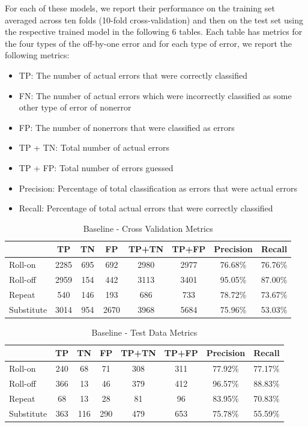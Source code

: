 \documentclass[letterpaper, 10 pt, conference]{ieeeconf}  %
\begin{document}
For each of these models, we report their performance on the training set averaged across ten folds (10-fold cross-validation) and then on the test set using the respective trained model in the following 6 tables. Each table has metrics for the four types of the off-by-one error and for each type of error, we report the following metrics:
\begin{itemize}
\item TP: The number of actual errors that were correctly classified
\item FN: The number of actual errors which were incorrectly classified as some other type of error of nonerror
\item FP: The number of nonerrors that were classified as errors
\item TP + TN: Total number of actual errors
\item TP + FP: Total number of errors guessed
\item Precision: Percentage of total classification as errors that were actual errors
\item Recall: Percentage of total actual errors that were correctly classified
\end{itemize}

\begin{table}[h]
\begin{center}
\begin{tabular}{|l|c|c|c|c|c|c|c|} \hline
& TP & TN & FP & TP+TN & TP+FP & Precision & Recall \\ \hline
Roll-on & 2285 & 695 & 692 & 2980 & 2977 & 76.68\% & 76.76\% \\ \hline
Roll-off & 2959 & 154 & 442 & 3113 & 3401 & 95.05\% & 87.00\% \\ \hline
Repeat & 540 & 146 & 193 & 686 & 733 & 78.72\% & 73.67\% \\ \hline
Substitute & 3014 & 954 & 2670 & 3968 & 5684 & 75.96\% & 53.03\% \\ \hline
\end{tabular}
\caption{Baseline - Cross Validation Metrics}
\label{table:basecvm}
\end{center}
\end{table}

\begin{table}[h]
\begin{center}
\begin{tabular}{|l|c|c|c|c|c|c|c|} \hline
& TP & TN & FP & TP+TN & TP+FP & Precision & Recall \\ \hline
Roll-on & 240 & 68 & 71 & 308 & 311 & 77.92\% & 77.17\% \\ \hline
Roll-off & 366 & 13 & 46 & 379 & 412 & 96.57\% & 88.83\% \\ \hline
Repeat & 68 & 13 & 28 & 81 & 96 & 83.95\% & 70.83\% \\ \hline
Substitute & 363 & 116 & 290 & 479 & 653 & 75.78\% & 55.59\% \\ \hline
\end{tabular}
\caption{Baseline - Test Data Metrics}
\label{table:basetdm}
\end{center}
\end{table}
\end{document}
